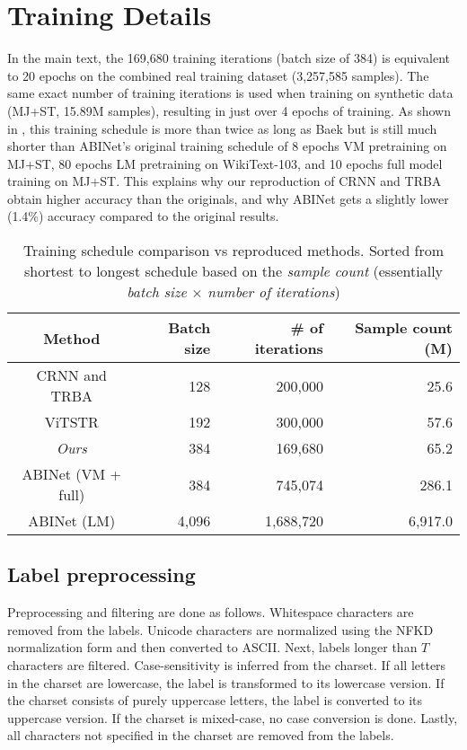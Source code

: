 \section{Training Details}

In the main text, the 169,680 training iterations (batch size of 384) is equivalent to 20 epochs on the combined real training dataset (3,257,585 samples). The same exact number of training iterations is used when training on synthetic data (MJ+ST, 15.89M samples), resulting in just over 4 epochs of training. As shown in , this training schedule is more than twice as long as Baek \etal \cite{Baek_2021_CVPR} but is still much shorter than ABINet's original training schedule of 8 epochs VM pretraining on MJ+ST, 80 epochs LM pretraining on WikiText-103, and 10 epochs full model training on MJ+ST. This explains why our reproduction of CRNN and TRBA obtain higher accuracy than the originals, and why ABINet gets a slightly lower (1.4\%) accuracy compared to the original results.

\begin{table}[htbp]
    \centering
    \setlength{\tabcolsep}{5pt}
    \caption{Training schedule comparison vs reproduced methods. Sorted from shortest to longest schedule based on the \textit{sample count} (essentially \textit{batch size} $\times$ \textit{number of iterations})}
    \label{tab:training-sched}
    \begin{tabular}{c r r | r}
        \toprule
        \textbf{Method} & \textbf{Batch size} & \textbf{\# of iterations} & \textbf{Sample count} (M) \\
        \midrule
        CRNN and TRBA \cite{Baek_2021_CVPR} & 128 & 200,000 & 25.6 \\
        ViTSTR \cite{atienza2021vitstr} & 192 & 300,000 & 57.6 \\
        \textit{Ours} & 384 & 169,680 & 65.2 \\
        ABINet (VM + full) \cite{Fang_2021_CVPR} & 384 &  745,074 & 286.1 \\
        ABINet (LM) \cite{Fang_2021_CVPR} & 4,096 & 1,688,720 & 6,917.0 \\
        \bottomrule
    \end{tabular}
\end{table}

\subsection{Label preprocessing}
Preprocessing and filtering are done as follows. Whitespace characters are removed from the labels. Unicode characters are normalized using the NFKD normalization form and then converted to ASCII. Next, labels longer than $T$ characters are filtered. Case-sensitivity is inferred from the charset. If all letters in the charset are lowercase, the label is transformed to its lowercase version. If the charset consists of purely uppercase letters, the label is converted to its uppercase version. If the charset is mixed-case, no case conversion is done. Lastly, all characters not specified in the charset are removed from the labels.

